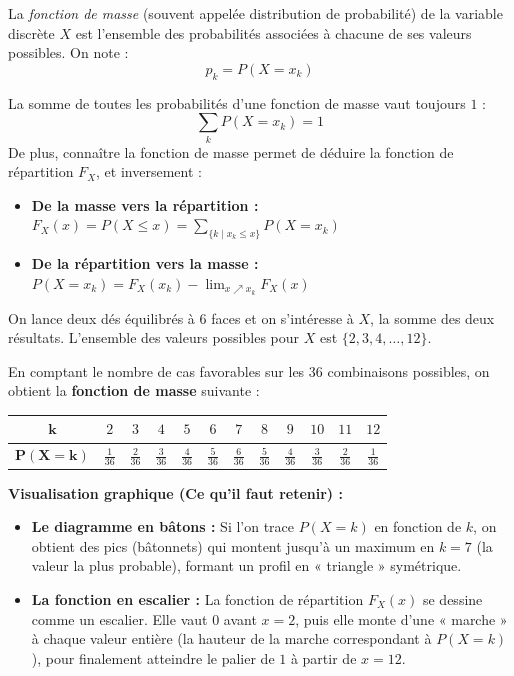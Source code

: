 \begin{definition}
    La \emph{fonction de masse} (souvent appelée distribution de probabilité) de la variable discrète $X$ est l'ensemble des probabilités associées à chacune de ses valeurs possibles. On note :
    \[
    p_k = P(X = x_k)
    \]
\end{definition}

\begin{remarque}
    La somme de toutes les probabilités d'une fonction de masse vaut toujours $1$ :
    \[
    \sum_{k} P(X = x_k) = 1
    \]
    De plus, connaître la fonction de masse permet de déduire la fonction de répartition $F_X$, et inversement :
    \begin{itemize}
        \item \textbf{De la masse vers la répartition :} $F_X(x) = P(X \leq x) = \displaystyle\sum_{\{k \mid x_k \leq x\}} P(X = x_k)$
        \item \textbf{De la répartition vers la masse :} $P(X = x_k) = F_X(x_k) - \displaystyle\lim_{x \nearrow x_k} F_X(x)$
    \end{itemize}
\end{remarque}

\begin{exemple}
    On lance deux dés équilibrés à 6 faces et on s'intéresse à $X$, la somme des deux résultats. L'ensemble des valeurs possibles pour $X$ est $\{2, 3, 4, \dots, 12\}$.
    
    En comptant le nombre de cas favorables sur les 36 combinaisons possibles, on obtient la \textbf{fonction de masse} suivante :
    \begin{center}
    \renewcommand{\arraystretch}{1.5}
    \begin{tabular}{|c|c|c|c|c|c|c|c|c|c|c|c|}
        \hline
        $\boldsymbol{k}$ & $2$ & $3$ & $4$ & $5$ & $6$ & $7$ & $8$ & $9$ & $10$ & $11$ & $12$ \\
        \hline
        $\boldsymbol{P(X=k)}$ & $\frac{1}{36}$ & $\frac{2}{36}$ & $\frac{3}{36}$ & $\frac{4}{36}$ & $\frac{5}{36}$ & $\frac{6}{36}$ & $\frac{5}{36}$ & $\frac{4}{36}$ & $\frac{3}{36}$ & $\frac{2}{36}$ & $\frac{1}{36}$ \\
        \hline
    \end{tabular}
    \end{center}
    
    \textbf{Visualisation graphique (Ce qu'il faut retenir) :}
    \begin{itemize}
        \item \textbf{Le diagramme en bâtons :} Si l'on trace $P(X=k)$ en fonction de $k$, on obtient des pics (bâtonnets) qui montent jusqu'à un maximum en $k=7$ (la valeur la plus probable), formant un profil en « triangle » symétrique.
        \item \textbf{La fonction en escalier :} La fonction de répartition $F_X(x)$ se dessine comme un escalier. Elle vaut $0$ avant $x=2$, puis elle monte d'une « marche » à chaque valeur entière (la hauteur de la marche correspondant à $P(X=k)$), pour finalement atteindre le palier de $1$ à partir de $x=12$.
    \end{itemize}
\end{exemple}

